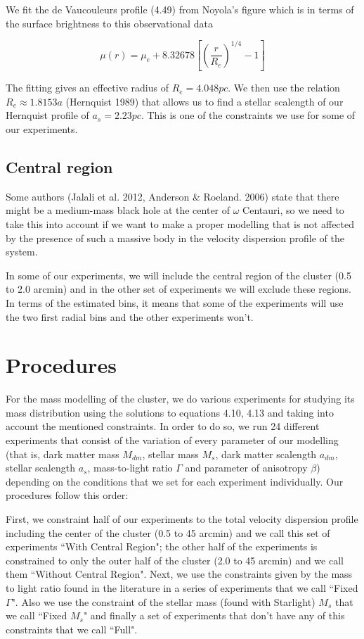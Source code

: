 We fit the de Vaucouleurs profile (4.49) from Noyola's figure which is in terms of the surface brightness to this observational data 

\begin{equation}
\mu(r)=\mu_{e}+8.32678\left[\left(\frac{r}{R_{e}}\right)^{1/4}-1\right]
\end{equation}

The fitting gives an effective radius of $R_{e}=4.048pc$. We then use the relation $R_{e}\approx1.8153a$ (Hernquist 1989) that allows us to find a stellar scalength of our Hernquist profile of $a_{s}=2.23pc$. This is one of the constraints we use for some of our experiments.

\subsection{Central region}

Some authors (Jalali et al. 2012, Anderson \& Roeland. 2006) state that there might be a medium-mass black hole at the center of $\omega$ Centauri, so we need to take this into account if we want to make a proper modelling that is not affected by the presence of such a massive body in the velocity dispersion profile of the system.

In some of our experiments, we will include the central region of the cluster (0.5 to 2.0 arcmin) and in the other set of experiments we will exclude these regions. In terms of the estimated bins, it means that some of the experiments will use the two first radial bins and the other experiments won't. 

\section{Procedures}

For the mass modelling of the cluster, we do various experiments for studying its mass distribution using the solutions to equations 4.10, 4.13 and taking into account the mentioned constraints. In order to do so, we run 24 different experiments that consist of the variation of every parameter of our modelling (that is, dark matter mass $M_{dm}$, stellar mass $M_{s}$, dark matter scalength $a_{dm}$, stellar scalength $a_{s}$, mass-to-light ratio $\Gamma$ and parameter of anisotropy $\beta$) depending on the conditions that we set for each experiment individually. Our procedures follow this order:

First, we constraint half of our experiments to the total velocity dispersion profile including the center of the cluster (0.5 to 45 arcmin) and we call this set of experiments ``With Central Region"; the other half of the experiments is constrained to only the outer half of the cluster (2.0 to 45 arcmin) and we call them ``Without Central Region". Next, we use the constraints given by the mass to light ratio found in the literature in a series of experiments that we call ``Fixed $\Gamma$". Also we use the constraint of the stellar mass (found with Starlight) $M_s$ that we call ``Fixed $M_s$" and finally a set of experiments that don't have any of this constraints that we call ``Full".

